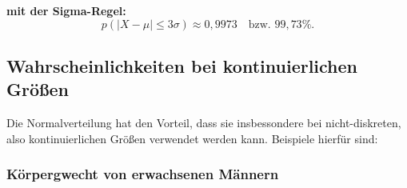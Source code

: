 \documentclass{article}
\begin{document}
\textbf{mit der Sigma-Regel:}
\[
p(|X - \mu| \leq 3\sigma) \approx 0{,}9973 \quad \text{bzw. } 99{,}73\%.
\]

\subsection{Wahrscheinlichkeiten bei kontinuierlichen Größen}
Die Normalverteilung hat den Vorteil, dass sie insbessondere bei nicht-diskreten, also kontinuierlichen
Größen verwendet werden kann. Beispiele hierfür sind:

\subsubsection{Körpergwecht von erwachsenen Männern}
\end{document}
